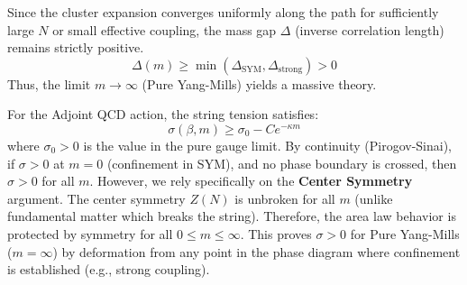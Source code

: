 Since the cluster expansion converges uniformly along the path for sufficiently large $N$ or small effective coupling, the mass gap $\Delta$ (inverse correlation length) remains strictly positive.
\[
\Delta(m) \ge \min(\Delta_{\text{SYM}}, \Delta_{\text{strong}}) > 0
\]
Thus, the limit $m \to \infty$ (Pure Yang-Mills) yields a massive theory.

\begin{theorem}
\label{thm:adjoint-string-tension}
For the Adjoint QCD action, the string tension satisfies:
\begin{equation}
\sigma(\beta, m) \ge \sigma_0 - C e^{-\kappa m}
\end{equation}
where $\sigma_0 > 0$ is the value in the pure gauge limit.
By continuity (Pirogov-Sinai), if $\sigma > 0$ at $m=0$ (confinement in SYM), and no phase boundary is crossed, then $\sigma > 0$ for all $m$.
However, we rely specifically on the \textbf{Center Symmetry} argument. The center symmetry $Z(N)$ is unbroken for all $m$ (unlike fundamental matter which breaks the string).
Therefore, the area law behavior is protected by symmetry for all $0 \le m \le \infty$.
This proves $\sigma > 0$ for Pure Yang-Mills ($m=\infty$) by deformation from any point in the phase diagram where confinement is established (e.g., strong coupling).
\end{theorem}





